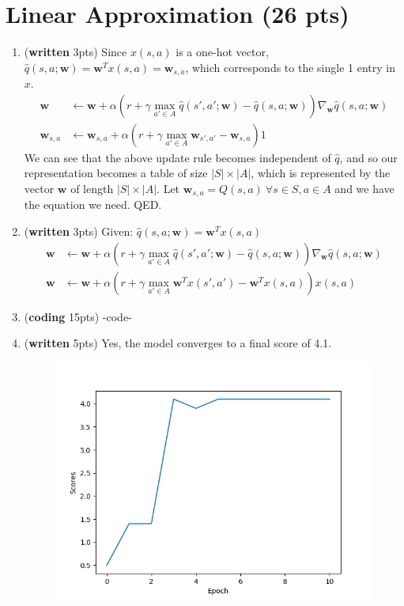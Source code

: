 \documentclass{article}
\begin{document}
\section{Linear Approximation (26 pts)}
\begin{enumerate}
\item (\textbf{written} 3pts) Since $x(s,a)$ is a one-hot vector, $\hat{q}(s,a;\textbf{w}) = \textbf{w}^Tx(s,a) = \textbf{w}_{s,a}$, which corresponds to the single 1 entry in $x$.
\begin{align*}
\textbf{w} &\leftarrow \textbf{w} + \alpha\left(r+\gamma \max_{a' \in A} \hat{q}\left(s',a'; \textbf{w} \right) - \hat{q}\left(s, a; \textbf{w} \right)\right) \nabla_{\textbf{w}}\hat{q}(s,a; \textbf{w}) \\
\textbf{w}_{s,a} &\leftarrow \textbf{w}_{s,a} + \alpha\left(r+\gamma \max_{a' \in A} \mathbf{w}_{s',a'} - \mathbf{w}_{s,a}\right) 1
\end{align*}
We can see that the above update rule becomes independent of $\hat{q}$, and so our representation becomes a table of size $|S|\times|A|$, which is represented by the vector $\textbf{w}$ of length $|S|\times|A|$. Let $\textbf{w}_{s,a} = Q(s,a) \ \forall s\in S, a\in A$ and we have the equation we need. QED.

 \item (\textbf{written} 3pts) Given: $\hat{q}(s,a;\mathbf{w})=\mathbf{w}^Tx(s,a)$
\begin{align*}
 \textbf{w} &\leftarrow \textbf{w} + \alpha\left(r+\gamma \max_{a' \in A} \hat{q}\left(s',a'; \textbf{w} \right) - \hat{q}\left(s, a; \textbf{w} \right)\right) \nabla_{\textbf{w}}\hat{q}(s,a; \textbf{w}) \\
 \textbf{w} &\leftarrow \textbf{w} + \alpha\left(r+\gamma \max_{a' \in A} \mathbf{w}^Tx(s',a') - \mathbf{w}^Tx(s,a)\right) x(s,a)
\end{align*}

 \item (\textbf{coding} 15pts) -code-
 
\item (\textbf{written} 5pts) Yes, the model converges to a final score of 4.1.
\begin{figure}[H]
	\centering
	\includegraphics[width=.5\linewidth]{scores_linear}
\end{figure}

\end{enumerate}
\end{document}
